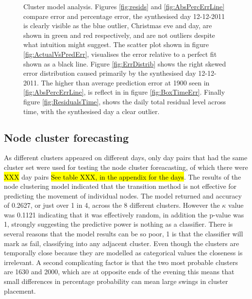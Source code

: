 \begin{figure}[ht]
\caption[Cluster model analysis]{Cluster model analysis. Figures  \ref{fig:resids} and \ref{fig:AbsPercErrLine} compare error and percentage error, the synthesised day 12-12-2011 is clearly visible as the blue outlier, Christmas eve and day, are shown in green and red respectively, and are not outliers despite what intuition might suggest. The scatter plot shown in figure \ref{fig:ActualVsPredErr}, visualises the error relative to a perfect fit shown as a black line. Figure \ref{fig:ErrDistrib} shows the right skewed error distribution caused primarily by the synthesised day 12-12-2011. The higher than average prediction error at 1900 seen in \ref{fig:AbsPercErrLine}, is reflect in in figure \ref{fig:BoxTimeErr}. Finally figure \ref{fig:ResidualsTime}, shows the daily total residual level across time, with the synthesised day a clear outlier.}
\label{fig:modanalysis}
\end{figure}

\FloatBarrier

\subsection{Node cluster forecasting}
\label{sec:NodeClustforce}
As different clusters appeared on different days, only day pairs that had the same cluster set were used for testing the node cluster foreacasting, of which there were \hl{XXX} day pairs \hl{See table XXX, in the appendix for the days}. The results of the node clustering model indicated that the transition method is not effective for predicting the movement of individual nodes. The model returned and accuracy of 0.2627, or just over 1 in 4, across the 8 different clusters. However the $\kappa$ value was 0.1121 indicating that it was effectively random, in addition the p-value was 1, strongly suggesting the predictive power is nothing as a classifier. There is several reasons that the model results can be so poor, 1 is that the classifier will mark as fail, classifying into any adjacent cluster. Even though the clusters are temporally close because they are modelled as categorical values the closeness is irrelevant. A second complicating factor is that the two most probable clusters are 1630 and 2000, which are at opposite ends of the evening this means that small differences in percentage probability can mean large swings in cluster placement. 

